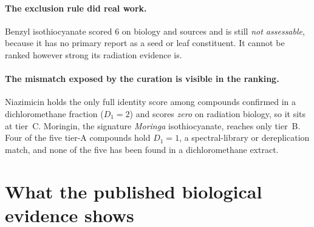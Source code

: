 \paragraph{The exclusion rule did real work.} Benzyl isothiocyanate scored 6 on biology and
sources and is still \emph{not assessable}, because it has no primary report as a seed or leaf
constituent. It cannot be ranked however strong its radiation evidence is.

\paragraph{The mismatch exposed by the curation is visible in the ranking.} Niazimicin holds
the only full identity score among compounds confirmed in a dichloromethane fraction
($D_1=2$) and scores \emph{zero} on radiation biology, so it sits at tier~C. Moringin, the
signature \textit{Moringa} isothiocyanate, reaches only tier~B. Four of the five tier-A
compounds hold $D_1=1$, a spectral-library or dereplication match, and none of the five has
been found in a dichloromethane extract.

\section{What the published biological evidence shows}\label{sec:biology}

